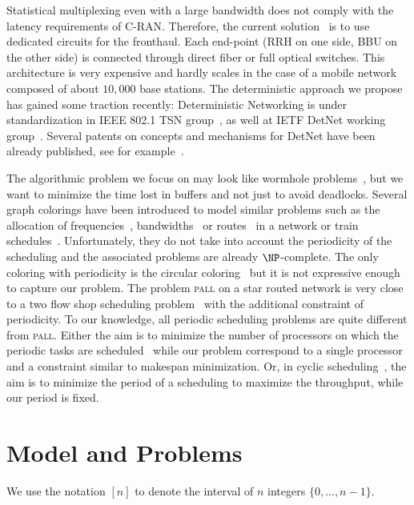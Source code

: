 \documentclass[10pt, conference, letterpaper]{IEEEtran}
\newcommand\pall{\textsc{pall}\xspace}
\begin{document}
 Statistical multiplexing even with a large bandwidth does not comply with the latency requirements of C-RAN. Therefore, the current solution~\cite{pizzinat2015things,tayq2017real} is to use dedicated circuits for the fronthaul. Each end-point (RRH on one side, BBU on the other side) is connected through direct fiber or full optical switches. This architecture is very expensive and hardly scales in the case of a mobile network composed of about $10,000$ base stations. The deterministic approach we propose has gained some traction recently: Deterministic Networking is under standardization in IEEE 802.1 TSN group~\cite{finn-detnet-architecture-08}, as well at IETF DetNet working group~\cite{ieee802}. Several patents on concepts and mechanisms for DetNet have been already published, see for example~\cite{howe2005time,leclerc2016transmission}. 
     
The algorithmic problem we focus on may look like wormhole problems~\cite{cole1996benefit}, but we want to minimize the time lost in buffers and not just to avoid deadlocks. Several graph colorings have been introduced to model similar problems such as the allocation of frequencies~\cite{borndorfer1998frequency}, bandwidths~\cite{erlebach2001complexity} or routes~\cite{cole1996benefit} in a network or train schedules~\cite{strotmann2007railway}. Unfortunately, they do not take into account the periodicity of the scheduling and the associated problems are already $\NP$-complete. The only coloring with periodicity is the circular coloring~\cite{zhou2013multiple} but it is not expressive enough to capture our problem. 
The problem \pall on a star routed network is very close to a two flow shop scheduling problem~\cite{yu2004minimizing}
with the additional constraint of periodicity. To our knowledge, all periodic scheduling problems are quite different from \pall.
Either the aim is to minimize the number of processors on which the periodic tasks are scheduled~\cite{korst1991periodic,hanen1993cyclic} while our problem correspond to a single processor and a constraint similar to makespan minimization. Or, in cyclic scheduling~\cite{levner2010complexity}, the aim is to minimize the period of a scheduling to maximize the throughput, while our period is fixed. 


\section{Model and Problems}\label{sec:def}

We use the notation $[n]$ to denote the interval of $n$ integers $\{0,\dots,n-1\}$.
\end{document}
